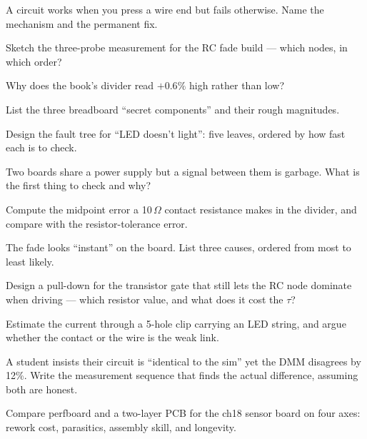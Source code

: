 \begin{exercise}[easy]
A circuit works when you press a wire end but fails otherwise. Name
the mechanism and the permanent fix.
\end{exercise}
\begin{exercise}[easy]
Sketch the three-probe measurement for the RC fade build --- which
nodes, in which order?
\end{exercise}
\begin{exercise}[easy]
Why does the book's divider read $+0.6\%$ high rather than low?
\end{exercise}
\begin{exercise}[easy]
List the three breadboard ``secret components'' and their rough
magnitudes.
\end{exercise}
\begin{exercise}[medium]
Design the fault tree for ``LED doesn't light'': five leaves,
ordered by how fast each is to check.
\end{exercise}
\begin{exercise}[medium]
Two boards share a power supply but a signal between them is
garbage. What is the first thing to check and why?
\end{exercise}
\begin{exercise}[medium]
Compute the midpoint error a 10\,$\Omega$ contact resistance makes
in the divider, and compare with the resistor-tolerance error.
\end{exercise}
\begin{exercise}[medium]
The fade looks ``instant'' on the board. List three causes, ordered
from most to least likely.
\end{exercise}
\begin{exercise}[hard]
Design a pull-down for the transistor gate that still lets the RC
node dominate when driving --- which resistor value, and what does
it cost the $\tau$?
\end{exercise}
\begin{exercise}[hard]
Estimate the current through a 5-hole clip carrying an LED string,
and argue whether the contact or the wire is the weak link.
\end{exercise}
\begin{exercise}[hard]
A student insists their circuit is ``identical to the sim'' yet the
DMM disagrees by 12\%. Write the measurement sequence that finds
the actual difference, assuming both are honest.
\end{exercise}
\begin{exercise}[hard]
Compare perfboard and a two-layer PCB for the ch18 sensor board on
four axes: rework cost, parasitics, assembly skill, and longevity.
\end{exercise}
